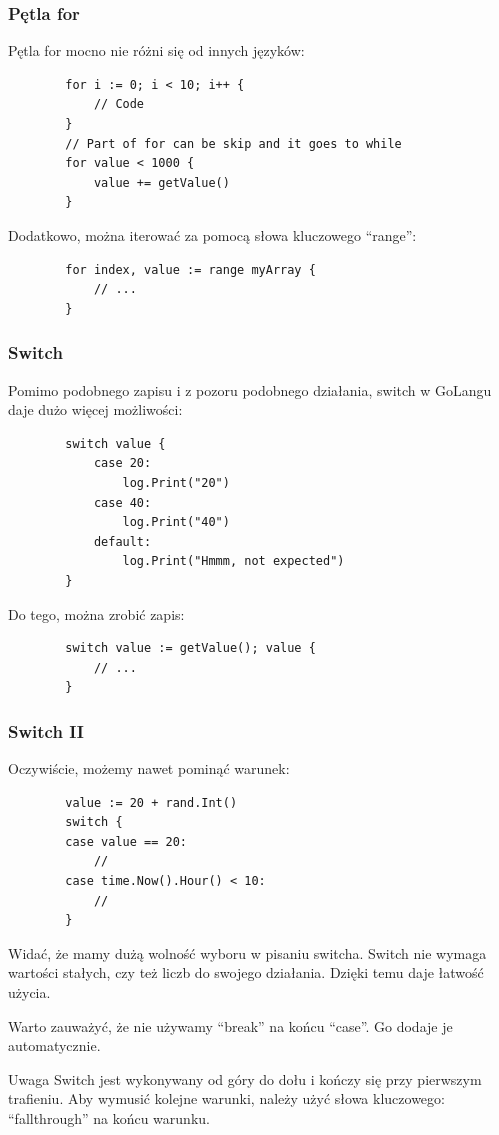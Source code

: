 \documentclass[10pt]{beamer}
\newcommand{\quotes}[1]{``#1''}
\begin{document}
\begin{frame}[fragile]
    \frametitle{Pętla for}
    Pętla for mocno nie różni się od innych języków:

    \begin{verbatim}
        for i := 0; i < 10; i++ {
            // Code
        }
        // Part of for can be skip and it goes to while
        for value < 1000 {
            value += getValue()
        }
    \end{verbatim}

    Dodatkowo, można iterować za pomocą słowa kluczowego \quotes{range}:
    \begin{verbatim}
        for index, value := range myArray {
            // ...
        }
    \end{verbatim}
\end{frame}

\begin{frame}[fragile]
    \frametitle{Switch}
    Pomimo podobnego zapisu i z pozoru podobnego działania, switch w GoLangu
    daje dużo więcej możliwości:

    \begin{verbatim}
        switch value {
            case 20:
                log.Print("20")
            case 40:
                log.Print("40")
            default:
                log.Print("Hmmm, not expected")
        }
    \end{verbatim}

    Do tego, można zrobić zapis:
    \begin{verbatim}
        switch value := getValue(); value {
            // ...
        }
    \end{verbatim}
\end{frame}

\begin{frame}[fragile]
    \frametitle{Switch II}
    Oczywiście, możemy nawet pominąć warunek:
    \begin{verbatim}
        value := 20 + rand.Int()
        switch {
        case value == 20:
            //
        case time.Now().Hour() < 10:
            //
        }
    \end{verbatim}

    Widać, że mamy dużą wolność wyboru w pisaniu switcha. Switch nie wymaga
    wartości stałych, czy też liczb do swojego działania. Dzięki temu
    daje łatwość użycia.

    Warto zauważyć, że nie używamy \quotes{break} na końcu \quotes{case}. Go
    dodaje je automatycznie.

    \begin{block}{Uwaga}
        Switch jest wykonywany od góry do dołu i kończy się przy pierwszym trafieniu.
        Aby wymusić kolejne warunki, należy użyć słowa kluczowego: \quotes{fallthrough}
        na końcu warunku.
    \end{block}
\end{frame}
\end{document}
